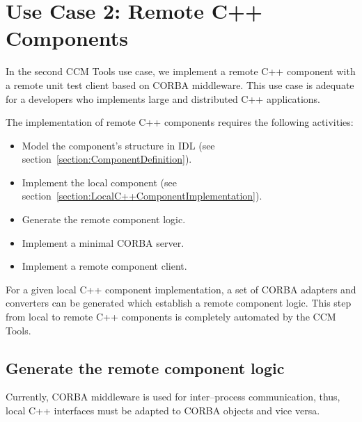 \section{Use Case 2: Remote C++ Components}
\label{section:RemoteC++ComponentImplementation}

In the second CCM Tools use case, we implement a remote C++ component with a
remote unit test client based on CORBA middleware. 
This use case is adequate for a developers who implements large and distributed
C++ applications.

\vspace{3mm}
The implementation of remote C++ components requires the following activities:
\begin{itemize}
	\item Model the component's structure in IDL (see section~\ref{section:ComponentDefinition}). 
	\item Implement the local component (see section~\ref{section:LocalC++ComponentImplementation}).
	\item Generate the remote component logic.
	\item Implement a minimal CORBA server.
	\item Implement a remote component client.
\end{itemize}

For a given local C++ component implementation, a set of CORBA
adapters and converters can be generated which establish a remote component logic.
This step from local to remote C++ components is completely automated by
the CCM Tools.


\subsection{Generate the remote component logic}
\label{subsection:GenerateRemoteComponentLogic}

Currently, CORBA middleware is used for inter--process communication, thus,
local C++ interfaces must be adapted to CORBA objects and vice versa.

